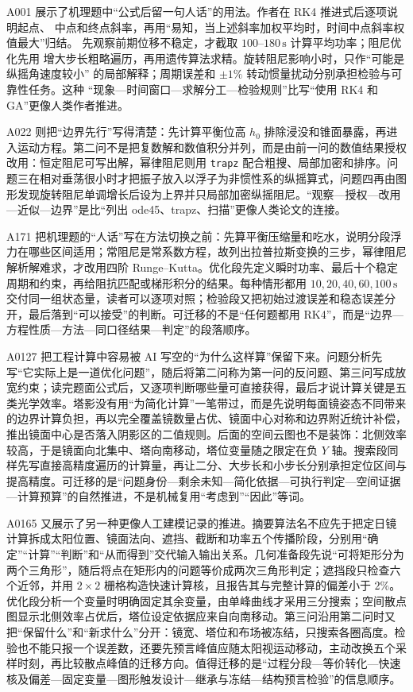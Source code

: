 A001 展示了机理题中“公式后留一句人话”的用法。作者在 RK4 推进式后逐项说明起点、
中点和终点斜率，再用“易知，当上述斜率加权平均时，时间中点斜率权值最大”归结。
先观察前期位移不稳定，才截取 $100$--$180\,\mathrm{s}$ 计算平均功率；阻尼优化先用
增大步长粗略遍历，再用遗传算法求精。旋转阻尼影响小时，只作“可能是纵摇角速度较小”
的局部解释；周期误差和 $\pm1\%$ 转动惯量扰动分别承担检验与可靠性任务。这种
“现象—时间窗口—求解分工—检验规则”比写“使用 RK4 和 GA”更像人类作者推进。

A022 则把“边界先行”写得清楚：先计算平衡位高 $h_0$ 排除浸没和锥面暴露，再进入运动方程。第二问不是把复数解和数值积分并列，而是由前一问的数值结果授权改用：恒定阻尼可写出解，幂律阻尼则用 \texttt{trapz} 配合粗搜、局部加密和排序。问题三在相对垂荡很小时才把振子放入以浮子为非惯性系的纵摇算式，问题四再由图形发现旋转阻尼单调增长后设为上界并只局部加密纵摇阻尼。“观察—授权—改用—近似—边界”是比“列出 ode45、trapz、扫描”更像人类论文的连接。

A171 把机理题的“人话”写在方法切换之前：先算平衡压缩量和吃水，说明分段浮力在哪些区间适用；常阻尼是常系数方程，故列出拉普拉斯变换的三步，幂律阻尼解析解难求，才改用四阶 Runge--Kutta。优化段先定义瞬时功率、最后十个稳定周期和约束，再给阻抗匹配或梯形积分的结果。每种情形都用 $10,20,40,60,100\,\mathrm{s}$ 交付同一组状态量，读者可以逐项对照；检验段又把初始过渡误差和稳态误差分开，最后落到“可以接受”的判断。可迁移的不是“任何题都用 RK4”，而是“边界—方程性质—方法—同口径结果—判定”的段落顺序。

A0127 把工程计算中容易被 AI 写空的“为什么这样算”保留下来。问题分析先写“它实际上是一道优化问题”，随后将第二问称为第一问的反问题、第三问写成放宽约束；读完题面公式后，又逐项判断哪些量可直接获得，最后才说计算关键是五类光学效率。塔影没有用“为简化计算”一笔带过，而是先说明每面镜姿态不同带来的边界计算负担，再以完全覆盖镜数量占优、镜面中心对称和边界附近统计补偿，推出镜面中心是否落入阴影区的二值规则。后面的空间云图也不是装饰：北侧效率较高，于是镜面向北集中、塔向南移动，塔位变量随之限定在负 $Y$ 轴。搜索段同样先写直接高精度遍历的计算量，再让二分、大步长和小步长分别承担定位区间与提高精度。可迁移的是“问题身份—剩余未知—简化依据—可执行判定—空间证据—计算预算”的自然推进，不是机械复用“考虑到”“因此”等词。

A0165 又展示了另一种更像人工建模记录的推进。摘要算法名不应先于把定日镜计算拆成太阳位置、镜面法向、遮挡、截断和功率五个传播阶段，分别用“确定”“计算”“判断”和“从而得到”交代输入输出关系。几何准备段先说“可将矩形分为两个三角形”，随后将点在矩形内的问题等价成两次三角形判定；遮挡段只检查六个近邻，并用 $2\times2$ 栅格构造快速计算核，且报告其与完整计算的偏差小于 $2\%$。优化段分析一个变量时明确固定其余变量，由单峰曲线才采用三分搜索；空间散点图显示北侧效率占优后，塔位设定依据应来自向南移动。第三问沿用第二问时又把“保留什么”和“新求什么”分开：镜宽、塔位和布场被冻结，只搜索各圈高度。检验也不能只报一个误差数，还要先预言峰值应随太阳视运动移动，主动改换五个采样时刻，再比较散点峰值的迁移方向。值得迁移的是“过程分段—等价转化—快速核及偏差—固定变量—图形触发设计—继承与冻结—结构预言检验”的信息顺序。

